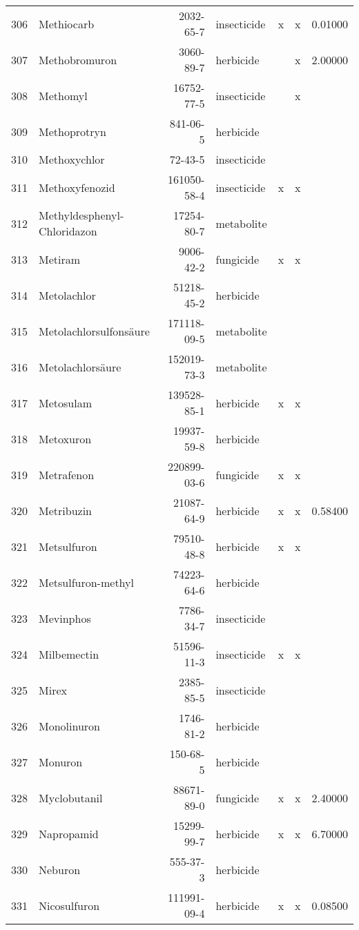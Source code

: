 \begin{longtable}{lp{4cm}rlp{1.3cm}p{1.3cm}p{1.5cm}}
  306 & Methiocarb & 2032-65-7 & insecticide & x & x & 0.01000 \\ 
  307 & Methobromuron & 3060-89-7 & herbicide &  & x & 2.00000 \\ 
  308 & Methomyl & 16752-77-5 & insecticide &  & x &  \\ 
  309 & Methoprotryn & 841-06-5 & herbicide &  &  &  \\ 
  310 & Methoxychlor & 72-43-5 & insecticide &  &  &  \\ 
  311 & Methoxyfenozid & 161050-58-4 & insecticide & x & x &  \\ 
  312 & Methyldesphenyl-Chloridazon & 17254-80-7 & metabolite &  &  &  \\ 
  313 & Metiram & 9006-42-2 & fungicide & x & x &  \\ 
  314 & Metolachlor & 51218-45-2 & herbicide &  &  &  \\ 
  315 & Metolachlorsulfonsäure & 171118-09-5 & metabolite &  &  &  \\ 
  316 & Metolachlorsäure & 152019-73-3 & metabolite &  &  &  \\ 
  317 & Metosulam & 139528-85-1 & herbicide & x & x &  \\ 
  318 & Metoxuron & 19937-59-8 & herbicide &  &  &  \\ 
  319 & Metrafenon & 220899-03-6 & fungicide & x & x &  \\ 
  320 & Metribuzin & 21087-64-9 & herbicide & x & x & 0.58400 \\ 
  321 & Metsulfuron & 79510-48-8 & herbicide & x & x &  \\ 
  322 & Metsulfuron-methyl & 74223-64-6 & herbicide &  &  &  \\ 
  323 & Mevinphos & 7786-34-7 & insecticide &  &  &  \\ 
  324 & Milbemectin & 51596-11-3 & insecticide & x & x &  \\ 
  325 & Mirex & 2385-85-5 & insecticide &  &  &  \\ 
  326 & Monolinuron & 1746-81-2 & herbicide &  &  &  \\ 
  327 & Monuron & 150-68-5 & herbicide &  &  &  \\ 
  328 & Myclobutanil & 88671-89-0 & fungicide & x & x & 2.40000 \\ 
  329 & Napropamid & 15299-99-7 & herbicide & x & x & 6.70000 \\ 
  330 & Neburon & 555-37-3 & herbicide &  &  &  \\ 
  331 & Nicosulfuron & 111991-09-4 & herbicide & x & x & 0.08500 \\ 

\end{longtable}
